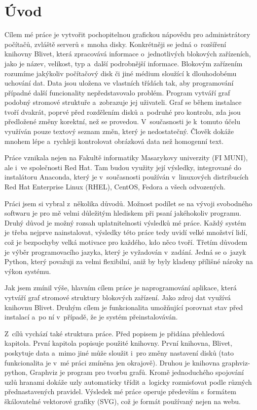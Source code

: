 \documentclass[color,table,oneside,nolot,nolof]{fithesis}
\begin{document}
\chapter{Úvod}
	Cílem mé  práce je vytvořit pochopitelnou grafickou nápovědu pro administrátory počítačů, zvláště serverů s~mnoha disky. 
	Konkrétněji se jedná o~rozšíření knihovny Blivet, která zpracovává informace o~jednotlivých blokových zařízeních, jako je název, velikost, typ 
	a~další podrobnější informace. Blokovým zařízením rozumíme jakýkoliv počítačový disk či jiné médium sloužící k dlouhodobému uchování dat.
	Data jsou uložena ve vlastních třídách tak, aby programování případné další funcionality 
	nepředstavovalo problém. Program vytváří graf podobný stromové struktuře a~zobrazuje jej uživateli. Graf se během instalace tvoří dvakrát, poprvé
	před rozdělením disků a~podruhé pro kontrolu, zda jsou předložené změny korektní, než se provedou. V~současnosti je k~tomuto účelu využíván pouze textový 
	seznam změn, který je nedostatečný. Člověk dokáže mnohem lépe a~rychleji kontrolovat obrázková data než homogenní text. 

	Práce vznikala nejen na Fakultě informatiky Masarykovy univerzity (FI MUNI), ale i~ve společnosti Red Hat. Tam budou využity její výsledky,
	integrované do instalátoru Anaconda, který je v~současnosti používán v~linuxových distribucích Red Hat Enterprise Linux (RHEL), CentOS, Fedora a všech
	odvozených.

	Práci jsem si vybral z~několika důvodů.  Možnost podílet se na vývoji svobodného softwaru je pro mě velmi důležitým hlediskem 
	při psaní jakéhokoliv programu. Druhý důvod je možný rozsah uplatnitelnosti výsledků mé práce. Každý systém je třeba nejprve nainstalovat, výsledky
	této práce tedy uvidí velké množství lidí, což je bezpochyby velká motivace pro každého, kdo něco tvoří. Třetím důvodem je výběr programovacího jazyka, který je vyžadován 
	v~zadání. Jedná se o~jazyk Python, který považuji za velmi flexibilní, aniž by byly kladeny přílišné nároky na výkon systému. 

	Jak jsem zmínil výše, hlavním cílem práce je naprogramování aplikace, která vytváří graf stromové struktury blokových zařízení. Jako zdroj dat
	využívá knihovnu Blivet. 
	Druhým cílem je funkcionalita umožňující porovnat stav před instalací a~po ní v~případě, že je systém přeinstalováván.

	Z~cílů vychází také struktura práce. Před popisem je přidána přehledová kapitola.
	První kapitola popisuje použité knihovny. První knihovna, Blivet\cite{blivet}, poskytuje data a~mimo jiné může sloužit i~pro změny 
	nastavení disků (tato funkcionalita je v~mé práci zmíněna jen okrajově). Druhou je knihovna graphviz-python\cite{graphviz-python}, Graphviz je program pro tvorbu grafů. Kromě
	jednoduchého spojování uzlů hranami dokáže uzly automaticky třídit a~logicky rozmisťovat podle různých přednastavených pravidel. 
	Výsledek mé práce operuje především s~formátem škálovatelné vektorové grafiky (SVG), což je formát používaný nejen na webu. 
\end{document}
